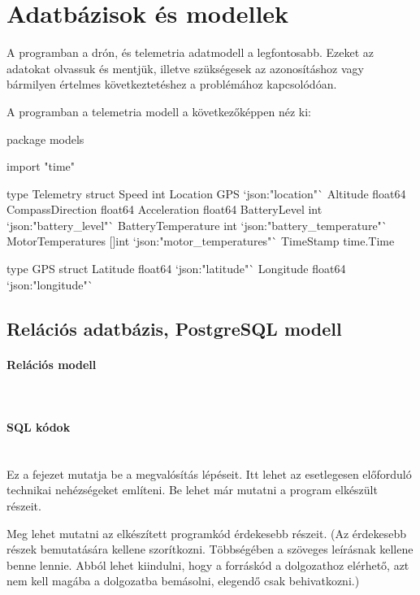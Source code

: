 

\section{Adatbázisok és modellek}
A programban a drón, és telemetria adatmodell a legfontosabb. Ezeket az adatokat olvassuk és mentjük,
illetve szükségesek az azonosításhoz vagy bármilyen értelmes következtetéshez a problémához kapcsolódóan.

A programban a telemetria modell a következőképpen néz ki:
\begin{python}
    package models

    import "time"

    type Telemetry struct {
    Speed              int
    Location           GPS `json:"location"`
    Altitude           float64
    CompassDirection   float64
    Acceleration       float64
    BatteryLevel       int   `json:"battery_level"`
    BatteryTemperature int   `json:"battery_temperature"`
    MotorTemperatures  []int `json:"motor_temperatures"`
    TimeStamp          time.Time
    }

    type GPS struct {
    Latitude  float64 `json:"latitude"`
    Longitude float64 `json:"longitude"`
    }

\end{python}

\subsection{Relációs adatbázis, PostgreSQL modell}

\paragraph{Relációs modell} \mbox{} \\


\paragraph{SQL kódok} \mbox{} \\

Ez a fejezet mutatja be a megvalósítás lépéseit.
Itt lehet az esetlegesen előforduló technikai nehézségeket említeni.
Be lehet már mutatni a program elkészült részeit.

Meg lehet mutatni az elkészített programkód érdekesebb részeit.
(Az érdekesebb részek bemutatására kellene szorítkozni.
Többségében a szöveges leírásnak kellene benne lennie.
Abból lehet kiindulni, hogy a forráskód a dolgozathoz elérhető, azt nem kell magába a dolgozatba bemásolni, elegendő csak behivatkozni.)

